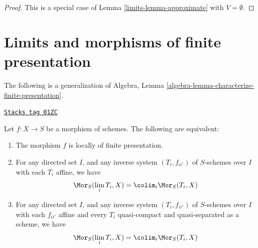 \begin{proof}

This is a special case of Lemma \ref{limits-lemma-approximate}
with $V = \emptyset$.
\end{proof}

\section{Limits and morphisms of finite presentation}
\label{limits-section-finite-presentation}
The following is a generalization of
Algebra, Lemma \ref{algebra-lemma-characterize-finite-presentation}.

\begin{proposition}
\label{limits-proposition-characterize-locally-finite-presentation}
\href{https://stacks.math.columbia.edu/tag/01ZC}{\texttt{Stacks tag 01ZC}}

\begin{reference}
\cite[IV, Proposition 8.14.2]{EGA}
\end{reference}
Let $f : X \to S$ be a morphism of schemes.
The following are equivalent:
\begin{enumerate}
\item The morphism $f$ is locally of finite presentation.
\item For any directed set $I$, and any
inverse system $(T_i, f_{ii'})$ of $S$-schemes over $I$
with each $T_i$ affine, we have
$$
\Mor_S(\lim_i T_i, X) =
\colim_i \Mor_S(T_i, X)
$$
\item For any directed set $I$, and any
inverse system $(T_i, f_{ii'})$ of $S$-schemes over $I$
with each $f_{ii'}$ affine and every $T_i$ quasi-compact and
quasi-separated as a scheme, we have
$$
\Mor_S(\lim_i T_i, X) =
\colim_i \Mor_S(T_i, X)
$$
\end{enumerate}
\end{proposition}

